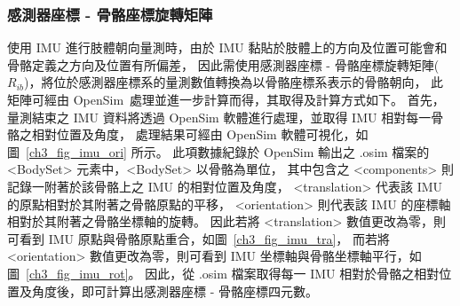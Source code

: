 \subsubsection{感測器座標 - 骨骼座標旋轉矩陣}
使用 IMU 進行肢體朝向量測時，由於 IMU 黏貼於肢體上的方向及位置可能會和骨骼定義之方向及位置有所偏差，
因此需使用感測器座標 - 骨骼座標旋轉矩陣($R_{ib}$)，將位於感測器座標系的量測數值轉換為以骨骼座標系表示的骨骼朝向，
此矩陣可經由 OpenSim~\cite{delp2007opensim}處理並進一步計算而得，其取得及計算方式如下。
首先，量測結束之 IMU 資料將透過 OpenSim 軟體進行處理，並取得 IMU 相對每一骨骼之相對位置及角度，
處理結果可經由 OpenSim 軟體可視化，如圖~\ref{ch3_fig_imu_ori} 所示。
此項數據紀錄於 OpenSim 輸出之 .osim 檔案的 <BodySet> 元素中，<BodySet> 以骨骼為單位，
其中包含之 <components> 則記錄一附著於該骨骼上之 IMU 的相對位置及角度，
<translation> 代表該 IMU 的原點相對於其附著之骨骼原點的平移，
<orientation> 則代表該 IMU 的座標軸相對於其附著之骨骼坐標軸的旋轉。
因此若將 <translation> 數值更改為零，則可看到 IMU 原點與骨骼原點重合，如圖~\ref{ch3_fig_imu_tra}，
而若將 <orientation> 數值更改為零，則可看到 IMU 坐標軸與骨骼坐標軸平行，如圖~\ref{ch3_fig_imu_rot}。
因此，從 .osim 檔案取得每一 IMU 相對於骨骼之相對位置及角度後，即可計算出感測器座標 - 骨骼座標四元數。
